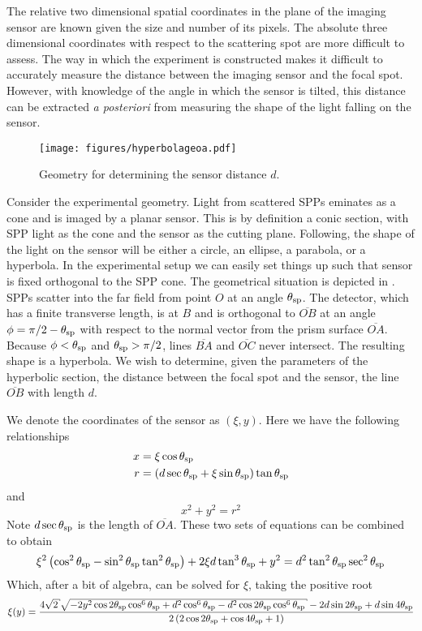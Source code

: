 The relative two dimensional spatial coordinates in the plane of the
imaging sensor are known given the size and number of its pixels.  The
absolute three dimensional coordinates with respect to the scattering spot
are more difficult to assess.  The way in which the experiment is
constructed makes it difficult to accurately measure the distance between
the imaging sensor and the focal spot.  However, with knowledge of the
angle in which the sensor is tilted, this distance can be extracted
\textit{a posteriori} from measuring the shape of the light falling on the
sensor.
\begin{figure}[ht]
\centering
\texttt{[image: figures/hyperbolageoa.pdf]}
\caption{Geometry for determining the sensor distance $d$.}
\label{fig:propgeo}
\end{figure}

Consider the experimental geometry.  Light from scattered SPPs eminates as
a cone and is imaged by a planar sensor.  This is by definition a conic
section, with SPP light as the cone and the sensor as the cutting
plane.  Following, the shape of the light on the sensor will be either a
circle, an ellipse, a parabola, or a hyperbola.  In the experimental setup
we can easily set things up such that sensor is fixed
orthogonal to the SPP cone.  The geometrical situation is depicted in
.  SPPs scatter into the far field from point $O$ at an
angle $\theta_\mathrm{sp}$.  The detector, which has a finite transverse length, is at $B$ and is
orthogonal to $\overline{OB}$ at an angle $\phi=\pi/2-\theta_\mathrm{sp}$ with respect to
the normal vector from the prism surface $\overline{OA}$.  Because
$\phi<\theta_\mathrm{sp}$ and $\theta_\mathrm{sp}>\pi/2$, lines $\overline{BA}$ and $\overline{OC}$ never
intersect. The resulting shape is a hyperbola.  We wish to determine, given
the parameters of the hyperbolic section, the distance between the focal
spot and the sensor, the line $\overline{OB}$ with length $d$.  

We denote the coordinates of the sensor as $(\xi,y)$.  Here we have the
following relationships
\begin{align}
x &= \xi \cos \theta_\mathrm{sp} \label{eqn:conic01a} \\
r &= \left(d \sec \theta_\mathrm{sp} + \xi \sin \theta_\mathrm{sp}\right) \tan\theta_\mathrm{sp} \label{eqn:conic01b}
\end{align}
and
\begin{equation}
x^2+y^2=r^2
\label{eqn:conic01c}
\end{equation}
Note $d \sec\theta_\mathrm{sp}$ is the length of $\overline{OA}$.  These two sets of
equations can be combined to obtain
\begin{equation}
\xi^2 \left(\cos ^2\theta_\mathrm{sp}-\sin ^2\theta_\mathrm{sp} \tan
^2\theta_\mathrm{sp}\right)+2 \xi d \tan ^3\theta_\mathrm{sp}+y^2=d^2 \tan
^2\theta_\mathrm{sp} \sec ^2\theta_\mathrm{sp}
\end{equation}
Which, after a bit of algebra, can be solved for $\xi$, taking
the positive root
\begin{equation}
\xi(y) = \frac{4 \sqrt{2} \sqrt{-2 y^2 \cos 2 \thetasp  \cos ^6\thetasp +d^2
\cos ^6\thetasp -d^2 \cos 2 \thetasp  \cos^6\thetasp}-2 d \sin 2 \thetasp
+d \sin 4 \thetasp }{2 \left(2 \cos 2 \thetasp +\cos 4 \thetasp +1\right)}
\label{eqn:conic02}
\end{equation}

